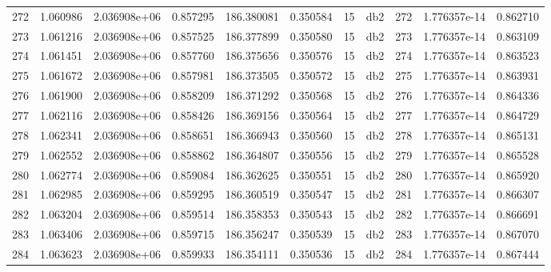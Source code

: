 \begin{tabular}{lrrrrrrlrrr}
272  &    1.060986 &        2.036908e+06 &  0.857295 &              186.380081 &    0.350584 &      15 &          db2 &    272 &   1.776357e-14 &      0.862710 \\
273  &    1.061216 &        2.036908e+06 &  0.857525 &              186.377899 &    0.350580 &      15 &          db2 &    273 &   1.776357e-14 &      0.863109 \\
274  &    1.061451 &        2.036908e+06 &  0.857760 &              186.375656 &    0.350576 &      15 &          db2 &    274 &   1.776357e-14 &      0.863523 \\
275  &    1.061672 &        2.036908e+06 &  0.857981 &              186.373505 &    0.350572 &      15 &          db2 &    275 &   1.776357e-14 &      0.863931 \\
276  &    1.061900 &        2.036908e+06 &  0.858209 &              186.371292 &    0.350568 &      15 &          db2 &    276 &   1.776357e-14 &      0.864336 \\
277  &    1.062116 &        2.036908e+06 &  0.858426 &              186.369156 &    0.350564 &      15 &          db2 &    277 &   1.776357e-14 &      0.864729 \\
278  &    1.062341 &        2.036908e+06 &  0.858651 &              186.366943 &    0.350560 &      15 &          db2 &    278 &   1.776357e-14 &      0.865131 \\
279  &    1.062552 &        2.036908e+06 &  0.858862 &              186.364807 &    0.350556 &      15 &          db2 &    279 &   1.776357e-14 &      0.865528 \\
280  &    1.062774 &        2.036908e+06 &  0.859084 &              186.362625 &    0.350551 &      15 &          db2 &    280 &   1.776357e-14 &      0.865920 \\
281  &    1.062985 &        2.036908e+06 &  0.859295 &              186.360519 &    0.350547 &      15 &          db2 &    281 &   1.776357e-14 &      0.866307 \\
282  &    1.063204 &        2.036908e+06 &  0.859514 &              186.358353 &    0.350543 &      15 &          db2 &    282 &   1.776357e-14 &      0.866691 \\
283  &    1.063406 &        2.036908e+06 &  0.859715 &              186.356247 &    0.350539 &      15 &          db2 &    283 &   1.776357e-14 &      0.867070 \\
284  &    1.063623 &        2.036908e+06 &  0.859933 &              186.354111 &    0.350536 &      15 &          db2 &    284 &   1.776357e-14 &      0.867444 \\

\end{tabular}
